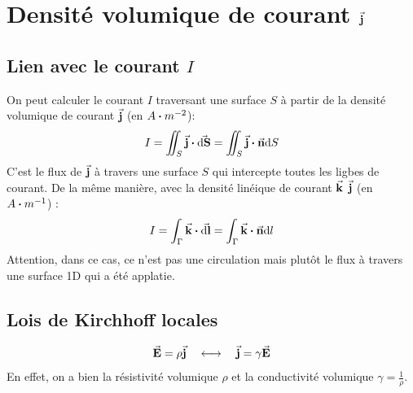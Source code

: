 \documentclass[a4paper,12pt]{article}
\begin{document}
    \section{Densité volumique de courant $\va{j}$}
        
        \subsection{Lien avec le courant $I$}

            On peut calculer le courant $I$ traversant une surface $S$ à partir de la densité volumique de courant $\va{j}$ (en $A\vdot m^{-2}$):
                $$ I = \iint_S \va{j} \vdot \va{\dd S} = \iint_S \va{j} \vdot \va{n}\dd S $$
            C'est le flux de $\va{j}$ à travers une surface $S$ qui intercepte toutes les ligbes de courant.
            De la même manière, avec la densité linéique de courant $\va{k}$ $\va{j}$ (en $A\vdot m^{-1}$) :
                $$ I = \int_\Gamma \va{k} \vdot \va{\dd l} = \int_\Gamma \va{k} \vdot \va{n}\dd l $$
            Attention, dans ce cas, ce n'est pas une circulation mais plutôt le flux à travers une surface 1D qui a été applatie.
            
        \subsection{Lois de Kirchhoff locales}
            $$ \va{E} = \rho \va{j} \quad \longleftrightarrow \quad \va{j} = \gamma \va{E} $$
            En effet, on a bien la résistivité volumique $\rho$ et la conductivité volumique $\gamma = \frac{1}{\rho}$.
\end{document}
